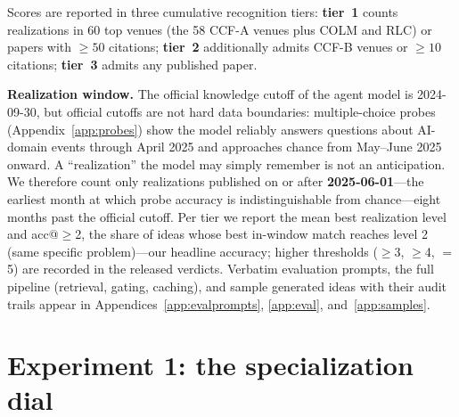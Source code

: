 \documentclass{article} %
\begin{document}
Scores are reported in three cumulative recognition tiers:
\textbf{tier~1} counts realizations in 60 top venues (the 58 CCF-A
venues plus COLM and RLC) or papers with $\geq 50$ citations;
\textbf{tier~2} additionally admits CCF-B venues or $\geq 10$ citations;
\textbf{tier~3} admits any published paper.

\textbf{Realization window.} The official knowledge cutoff of the agent
model is 2024-09-30, but official cutoffs are not hard data boundaries:
multiple-choice probes (Appendix~\ref{app:probes}) show the model
reliably answers questions about AI-domain events through April 2025 and
approaches chance from May--June 2025 onward. A ``realization'' the
model may simply remember is not an anticipation. We therefore count
only realizations published on or after \textbf{2025-06-01}---the
earliest month at which probe accuracy is indistinguishable from
chance---eight months past the official cutoff. Per tier we report the
mean best realization level and acc@$\geq$2, the share of ideas whose
best in-window match reaches level 2 (same specific problem)---our
headline accuracy; higher thresholds ($\geq$3, $\geq$4, $=$5) are
recorded in the released verdicts. Verbatim evaluation prompts, the
full pipeline (retrieval, gating, caching), and sample generated ideas
with their audit trails appear in
Appendices~\ref{app:evalprompts}, \ref{app:eval},
and~\ref{app:samples}.

\section{Experiment 1: the specialization dial}
\label{sec:dial}
\end{document}
